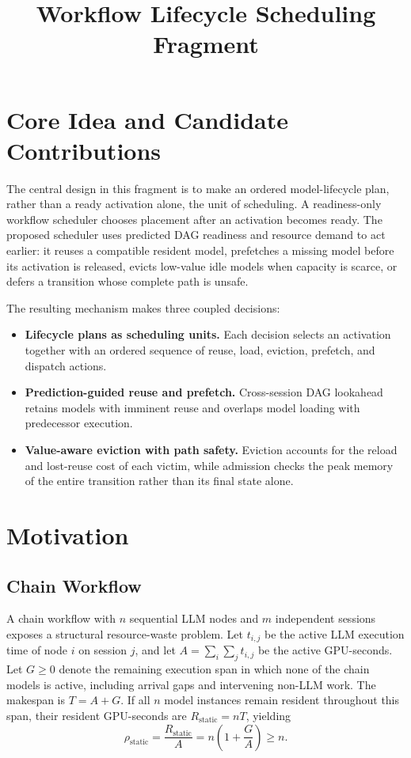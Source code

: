 \documentclass{article}
\title{Workflow Lifecycle Scheduling Fragment}
\author{}
\date{}
\begin{document}
\maketitle

\section{Core Idea and Candidate Contributions}

The central design in this fragment is to make an ordered model-lifecycle plan,
rather than a ready activation alone, the unit of scheduling. A readiness-only
workflow scheduler chooses placement after an activation becomes ready. The
proposed scheduler uses predicted DAG readiness and resource demand to act
earlier: it reuses a compatible resident model, prefetches a missing model
before its activation is released, evicts low-value idle models when capacity
is scarce, or defers a transition whose complete path is unsafe.

The resulting mechanism makes three coupled decisions:

\begin{itemize}
    \item \textbf{Lifecycle plans as scheduling units.} Each decision selects an
    activation together with an ordered sequence of reuse, load, eviction,
    prefetch, and dispatch actions.
    \item \textbf{Prediction-guided reuse and prefetch.} Cross-session DAG
    lookahead retains models with imminent reuse and overlaps model loading with
    predecessor execution.
    \item \textbf{Value-aware eviction with path safety.} Eviction accounts for
    the reload and lost-reuse cost of each victim, while admission checks the
    peak memory of the entire transition rather than its final state alone.
\end{itemize}

\section{Motivation}

\subsection{Chain Workflow}

A chain workflow with $n$ sequential LLM nodes and $m$ independent sessions
exposes a structural resource-waste problem. Let $t_{i,j}$ be the active LLM
execution time of node $i$ on session $j$, and let
$A=\sum_i\sum_j t_{i,j}$ be the active GPU-seconds. Let $G\ge 0$ denote the
remaining execution span in which none of the chain models is active, including
arrival gaps and intervening non-LLM work. The makespan is $T=A+G$. If all $n$
model instances remain resident throughout this span, their resident GPU-seconds
are $R_{\mathrm{static}}=nT$, yielding
\[
    \rho_{\mathrm{static}}
    = \frac{R_{\mathrm{static}}}{A}
    = n\left(1+\frac{G}{A}\right)
    \ge n.
\]
\end{document}
